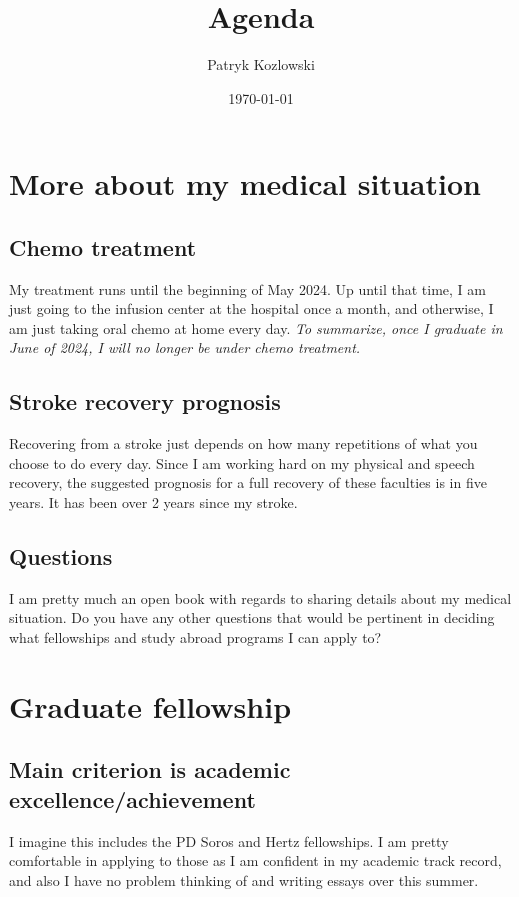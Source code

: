 \documentclass[12pt]{article}
\title{Agenda}
\author{Patryk Kozlowski}
\date{\today}
\begin{document}
\maketitle
\section{More about my medical situation}
\subsection{Chemo treatment}
My treatment runs until the beginning of May 2024. Up until that time, I am just going to the infusion center at the hospital once a month, and otherwise, I am just taking oral chemo at home every day. \emph{To summarize, once I graduate in June of 2024, I will no longer be under chemo treatment.}
\subsection{Stroke recovery prognosis}
Recovering from a stroke just depends on how many repetitions of what you choose to do every day. Since I am working hard on my physical and speech recovery, the suggested prognosis for a full recovery of these faculties is in five years. It has been over 2 years since my stroke.
\subsection{Questions}
I am pretty much an open book with regards to sharing details about my medical situation. Do you have any other questions that would be pertinent in deciding what fellowships and study abroad programs I can apply to?
\section{Graduate fellowship}
\subsection{Main criterion is academic excellence/achievement}
I imagine this includes the PD Soros and Hertz fellowships. I am pretty comfortable in applying to those as I am confident in my academic track record, and also I have no problem thinking of and writing essays over this summer.
\end{document}
